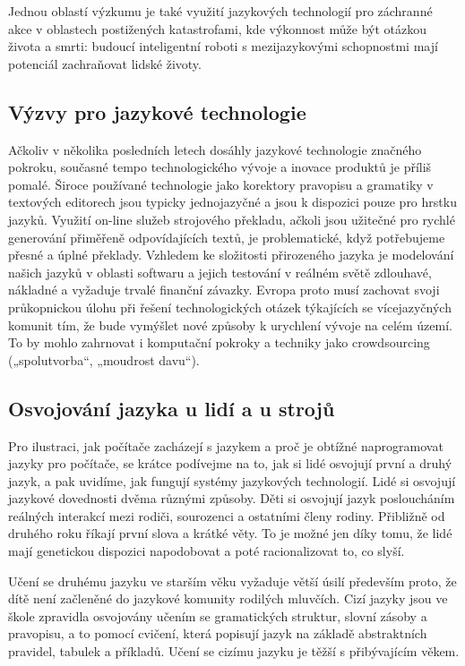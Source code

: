\begin{multicols}{2}
Jednou oblastí výzkumu je také využití jazykových technologií pro záchranné akce v oblastech postižených katastrofami, kde výkonnost může být otázkou života a smrti: budoucí inteligentní roboti s mezijazykovými schopnostmi mají potenciál zachraňovat lidské životy.

\subsection{Výzvy pro jazykové technologie}

Ačkoliv v několika posledních letech dosáhly jazykové technologie značného pokroku, současné tempo technologického vývoje a inovace produktů je příliš pomalé. Široce používané technologie jako korektory pravopisu a gramatiky v textových editorech jsou typicky jednojazyčné a jsou k dispozici pouze pro hrstku jazyků. Využití on-line služeb strojového překladu, ačkoli jsou užitečné pro rychlé generování přiměřeně odpovídajících textů, je problematické, když potřebujeme přesné a úplné překlady. Vzhledem ke složitosti přirozeného jazyka je modelování našich jazyků v oblasti softwaru a jejich testování v reálném světě zdlouhavé, nákladné a vyžaduje trvalé finanční závazky. Evropa proto musí zachovat svoji průkopnickou úlohu při řešení technologických otázek týkajících se vícejazyčných komunit tím, že bude vymýšlet nové způsoby k urychlení vývoje na celém území. To by mohlo zahrnovat i komputační pokroky a techniky jako crowdsourcing („spolutvorba“, „moudrost davu“).


\subsection{Osvojování jazyka u lidí a u strojů}

Pro ilustraci, jak počítače zacházejí s jazykem a proč je obtížné naprogramovat jazyky pro počítače, se krátce podívejme na to, jak si lidé osvojují první a druhý jazyk, a pak uvidíme, jak fungují systémy jazykových technologií.
Lidé si osvojují jazykové dovednosti dvěma různými způsoby. Děti si osvojují jazyk posloucháním reálných interakcí mezi rodiči, sourozenci a ostatními členy rodiny. Přibližně od druhého roku říkají první slova a krátké věty. To je možné jen díky tomu, že lidé mají genetickou dispozici napodobovat a poté racionalizovat to, co slyší.

Učení se druhému jazyku ve starším věku vyžaduje větší úsilí především proto, že dítě není začleněné do jazykové komunity rodilých mluvčích. Cizí jazyky jsou ve škole zpravidla osvojovány učením se gramatických struktur, slovní zásoby a pravopisu, a to pomocí cvičení, která popisují jazyk na základě abstraktních pravidel, tabulek a příkladů. Učení se cizímu jazyku je těžší s přibývajícím věkem.


\end{multicols}
